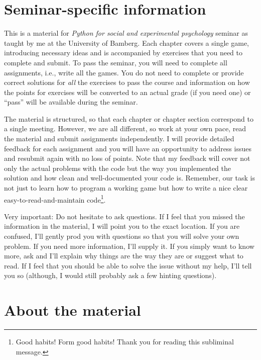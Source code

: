 \documentclass[
]{book}
\begin{document}
\hypertarget{seminar-specific-information}{%
\section{Seminar-specific information}\label{seminar-specific-information}}

This is a material for \emph{Python for social and experimental psychology} seminar as taught by me at the University of Bamberg. Each chapter covers a single game, introducing necessary ideas and is accompanied by exercises that you need to complete and submit. To pass the seminar, you will need to complete all assignments, i.e., write all the games. You do not need to complete or provide correct solutions for \emph{all} the exercises to pass the course and information on how the points for exercises will be converted to an actual grade (if you need one) or ``pass'' will be available during the seminar.

The material is structured, so that each chapter or chapter section correspond to a single meeting. However, we are all different, so work at your own pace, read the material and submit assignments independently. I will provide detailed feedback for each assignment and you will have an opportunity to address issues and resubmit again with no loss of points. Note that my feedback will cover not only the actual problems with the code but the way you implemented the solution and how clean and well-documented your code is. Remember, our task is not just to learn how to program a working game but how to write a nice clear easy-to-read-and-maintain code\footnote{Good habits! Form good habits! Thank you for reading this subliminal message.}.

Very important: Do not hesitate to ask questions. If I feel that you missed the information in the material, I will point you to the exact location. If you are confused, I'll gently prod you with questions so that you will solve your own problem. If you need more information, I'll supply it. If you simply want to know more, ask and I'll explain why things are the way they are or suggest what to read. If I feel that you should be able to solve the issue without my help, I'll tell you so (although, I would still probably ask a few hinting questions).

\hypertarget{about-the-material}{%
\section{About the material}\label{about-the-material}}
\end{document}
